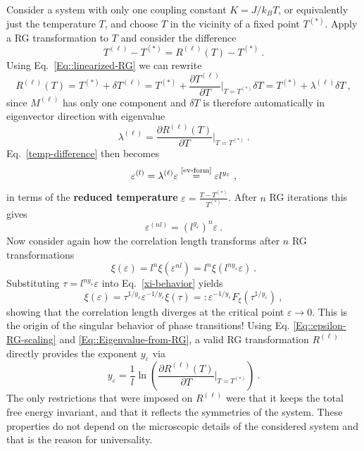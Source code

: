 	Consider a system with only one coupling constant $K = J /	k_B T$, or equivalently just the temperature $T$, and choose $T$ in the vicinity of a fixed point $T^{(*)}$. Apply a RG transformation to $T$ and consider the difference
	\begin{equation} \label{temp-difference}
		T^{(\ell)} - T^{(*)} =	R^{(\ell)}(T) - T^{(*)}~.
	\end{equation}
	Using Eq.~\eqref{Eq::linearized-RG} we can rewrite
	\begin{equation}
		R^{(\ell)}(T) =	T^{(*)} + \delta T^{(\ell)} =	T^{(*)} + \frac{\partial T^{(\ell)}}{\partial T} \bigg |_{T =	T^{(*)}} \delta T =	T^{(*)} + \lambda^{(\ell)} \delta T~,
	\end{equation}
	since $M^{(\ell)}$ has only one component and $\delta T$ is therefore automatically in eigenvector direction with eigenvalue
	\begin{equation} \label{Eq::Eigenvalue-from-RG}
		\lambda^{(\ell)} =	\frac{\partial R^{(\ell)} (T)}{\partial T} \bigg|_{T =	T^{(*)}}~.
	\end{equation}
	Eq.~\eqref{temp-difference} then becomes
	\def\equationautorefname{Eq.}
	\begin{equation} \label{Eq::epsilon-RG-scaling}
		\varepsilon^{(l)} =	\lambda^{(\ell)} \varepsilon \overset{\text{\autoref{ev-form}}}{=} \varepsilon l^{y_\varepsilon}~,
	\end{equation}\def\equationautorefname{Equation}
	in terms of the \textbf{reduced temperature} $ \varepsilon =	\frac{T - T^{(*)}}{T^{(*)}}$. After $n$ RG iterations this gives
	\begin{equation}
		\varepsilon^{(nl)} = \left( l^{y_\varepsilon}	\right)^n \varepsilon~.
	\end{equation}
	Now consider again how the correlation length transforms after $n$ RG transformations
	\begin{equation} \label{xi-behavior}
		\xi(\varepsilon) =	l^n \xi(\varepsilon^{nl}) =	l^n \xi( l^{ny_\varepsilon} \varepsilon)~.
	\end{equation}
	Substituting $\tau =	l^{ny_\varepsilon} \varepsilon$ into Eq.~\eqref{xi-behavior} yields
	\begin{equation} \label{Eq::RG-xi-scaling}
		\xi(\varepsilon) =	\tau^{1 / y_\varepsilon} \varepsilon^{-1/ y_\varepsilon} \xi(\tau) =:	\varepsilon^{-{1}/{y_\varepsilon}} F_\xi (\tau^{1 /	y_\varepsilon})~,
	\end{equation}
	showing that the correlation length diverges at the critical point $\varepsilon \rightarrow 0$. This is the origin of the singular behavior of phase transitions! Using Eq. \eqref{Eq::epsilon-RG-scaling} and \eqref{Eq::Eigenvalue-from-RG}, a valid RG transformation $R^{(\ell)}$ directly provides the exponent $y_\varepsilon$ via
	\begin{equation}
		y_\varepsilon =	\frac{1}{l} \ln \left(\frac{\partial R^{(\ell)} (T)}{\partial T} \bigg|_{T	=	T^{(*)}}\right)~.
	\end{equation}
	The only restrictions that were imposed on $R^{(\ell)}$ were that it keeps the total free energy invariant, and that it reflects the symmetries of the system. These properties do not depend on the microscopic details of the considered system and that is the reason for universality.
